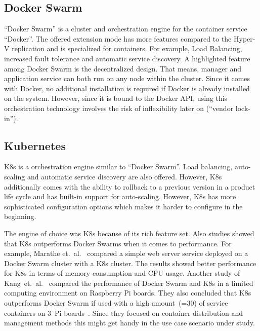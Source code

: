 \subsection{Docker Swarm} \enquote{Docker Swarm} is a cluster and orchestration engine for the container service \enquote{Docker}. The offered extension mode has more features compared to the Hyper-V replication and is specialized for containers. For example, Load Balancing, increased fault tolerance and automatic service discovery.
A highlighted feature among Docker Swarm is the decentralized design. That means, manager and application service can both run on any node within the cluster. Since it comes with Docker, no additional installation is required if Docker is already installed on the system.
However, since it is bound to the Docker \ac{API}, using this orchestration technology involves the risk of inflexibility later on (\enquote{vendor lock-in}).

 
\subsection{Kubernetes}
\acf{K8s} is a orchestration engine similar to \enquote{Docker Swarm}. Load balancing, auto-scaling and automatic service discovery are also offered. However, \ac{K8s} additionally comes with the ability to rollback to a previous version in a product life cycle and has built-in support for auto-scaling.
However, \ac{K8s} has more sophisticated configuration options which makes it harder to configure in the beginning.


The engine of choice was \ac{K8s} because of its rich feature set.
Also studies showed that \ac{K8s} outperforms Docker Swarms when it comes to performance. For example, Marathe et.~al.~\cite{Marathe.2019} compared a simple web server service deployed on a Docker Swarm cluster with a \ac{K8s} cluster. The results showed better performance for \ac{K8s} in terms of memory consumption and CPU usage. Another study of Kang~et.~al.~\cite{Kang.2021} compared the performance of Docker Swarm and \ac{K8s} in a limited computing environment on Raspberry Pi boards. They also concluded that \ac{K8s} outperforms Docker Swarm if used with a high amount~(=30) of service containers on 3~Pi boards~\cite{Kang.2021}. Since they focused on container distribution and management methods this might get handy in the use case scenario under study.


